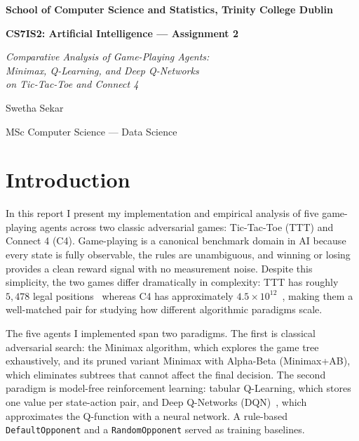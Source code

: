 \documentclass[11pt,a4paper]{article}
\begin{document}
\begin{titlepage}
    \centering
    \vspace{1.5cm}
    {\large\bfseries School of Computer Science and Statistics, Trinity College Dublin}\par
    \vspace{1.5cm}
    {\LARGE\bfseries\color{tcdblue} CS7IS2: Artificial Intelligence --- Assignment 2}\par
    \vspace{1cm}
    {\Large\itshape Comparative Analysis of Game-Playing Agents:\\[4pt]
    Minimax, Q-Learning, and Deep Q-Networks\\[4pt]
    on Tic-Tac-Toe and Connect 4}\par
    \vfill
    {\large Swetha Sekar }\par
    {\large MSc Computer Science --- Data Science}\par
\end{titlepage}

\tableofcontents
\newpage

\section{Introduction}

In this report I present my implementation and empirical analysis of five game-playing agents across
two classic adversarial games: Tic-Tac-Toe (TTT) and Connect 4 (C4). Game-playing is a canonical
benchmark domain in AI because every state is fully observable, the rules are unambiguous, and winning
or losing provides a clean reward signal with no measurement noise. Despite this simplicity, the two
games differ dramatically in complexity: TTT has roughly $5{,}478$ legal positions~\cite{gardner1988}
whereas C4 has approximately $4.5 \times 10^{12}$~\cite{allis1988}, making them a well-matched pair
for studying how different algorithmic paradigms scale.

The five agents I implemented span two paradigms. The first is classical adversarial search: the
Minimax algorithm, which explores the game tree exhaustively, and its pruned variant Minimax with
Alpha-Beta (Minimax+AB), which eliminates subtrees that cannot affect the final decision. The second
paradigm is model-free reinforcement learning: tabular Q-Learning, which stores one value per
state-action pair, and Deep Q-Networks (DQN)~\cite{mnih2015}, which approximates the Q-function with
a neural network. A rule-based \texttt{DefaultOpponent} and a \texttt{RandomOpponent} served as
training baselines.
\end{document}
